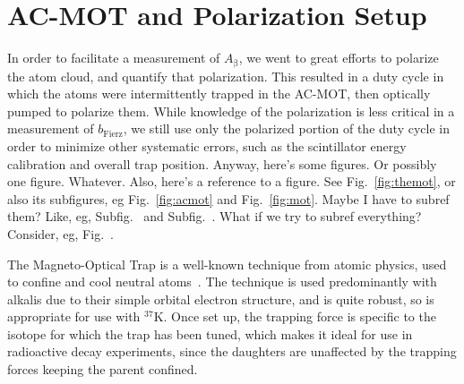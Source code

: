 %


\section{AC-MOT and Polarization Setup}

In order to facilitate a measurement of $A_{\mathrm{\beta}}$, we went to great efforts to polarize the atom cloud, and quantify that polarization.  This resulted in a duty cycle in which the atoms were intermittently trapped in the AC-MOT, then optically pumped to polarize them.  While knowledge of the polarization is less critical in a measurement of $b_{\mathrm{Fierz}}$, we still use only the polarized portion of the duty cycle in order to minimize other systematic errors, such as the scintillator energy calibration and overall trap position.
Anyway, here's some figures.  Or possibly one figure.  Whatever.  Also, here's a reference to a figure.  See Fig.~\ref*{fig:themot}, or also its subfigures, eg Fig.~\ref{fig:acmot} and Fig.~\ref{fig:mot}.  Maybe I have to subref them?  Like, eg, Subfig.~ and Subfig.~.  What if we try to subref everything?  Consider, eg, Fig.~.


The Magneto-Optical Trap is a well-known technique from atomic physics, used to confine and cool neutral atoms~\cite{raabprentiss}.  The technique is used predominantly with alkalis due to their simple orbital electron structure, and is quite robust, so is appropriate for use with $^{37}\textrm{K}$.  Once set up, the trapping force is specific to the isotope for which the trap has been tuned, which makes it ideal for use in radioactive decay experiments, since the daughters are unaffected by the trapping forces keeping the parent confined.

